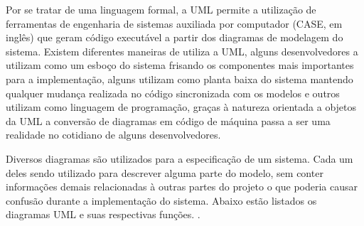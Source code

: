 Por se tratar de uma linguagem formal, a UML permite a utilização de ferramentas de engenharia de sistemas auxiliada por computador (CASE, em inglês) que geram código executável a partir dos diagramas de modelagem do sistema. Existem diferentes maneiras de utiliza a UML, alguns desenvolvedores a utilizam como um esboço do sistema frisando os componentes mais importantes para a implementação, alguns utilizam como planta baixa do sistema mantendo qualquer mudança realizada no código sincronizada com os modelos e outros utilizam como linguagem de programação, graças à natureza orientada a objetos da UML a conversão de diagramas em código de máquina passa a ser uma realidade no cotidiano de alguns desenvolvedores. \cite{UML:2006}

Diversos diagramas são utilizados para a especificação de um sistema. Cada um deles sendo utilizado para descrever alguma parte do modelo, sem conter informações demais relacionadas à outras partes do projeto o que poderia causar confusão durante a implementação do sistema. Abaixo estão listados os diagramas UML e suas respectivas funções. \cite{UML:2006}.

